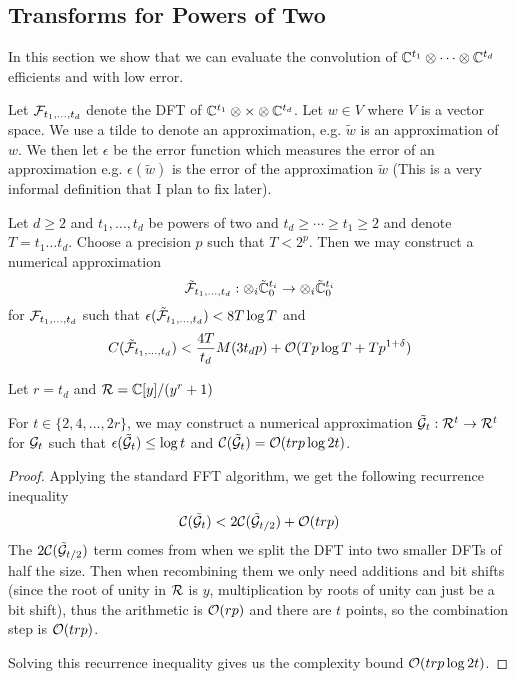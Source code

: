 \subsection{Transforms for Powers of Two}

In this section we show that we can evaluate the convolution of ${\mathbb C}^{t_1} \otimes \cdots \otimes {\mathbb C}^{t_d}$ efficients and with low error.

Let $\mathcal F_{t_1, \ldots, t_d}$ denote the DFT of ${\mathbb C}^{t_1} \otimes \times \otimes {\mathbb C}^{t_d}$.
Let $w \in V$ where $V$ is a vector space. We use a tilde to denote an approximation, e.g. $\tilde{w}$ is an approximation of $w$. We then let $\epsilon$ be the error function which measures the error of an approximation e.g. $\epsilon(\tilde{w})$ is the error of the approximation $\tilde{w}$ (This is a very informal definition that I plan to fix later).

\begin{theorem}
    Let $d \geq 2$ and $t_1, \ldots, t_d$ be powers of two and $t_d \geq \cdots \geq t_1 \geq 2$ and denote $T = t_1 \ldots t_d$. Choose a precision $p$ such that $T < 2^p$. Then we may construct a numerical approximation
    \[
        \tilde {\mathcal F}_{t_1, \ldots, t_d} : \otimes_i \tilde{{\mathbb C}}^{t_i}_0 \to \otimes_i \tilde{{\mathbb C}}^{t_i}_0
    \]
    for $\mathcal F_{t_1, \ldots, t_d}$ such that $\epsilon(\tilde{\mathcal F}_{t_1, \ldots, t_d}) < 8 T \log T$ and
    \[
        C(\tilde{\mathcal F}_{t_1, \ldots, t_d}) < \frac{4T}{t_d} M(3t_d p) + \mathcal O(Tp\log T + Tp^{1 + \delta})
    \]
\end{theorem}

Let $r = t_d$ and $\mathcal R = {\mathbb C}[y] / (y^r + 1)$

\begin{lemma}
    For $t \in \{2, 4, \ldots, 2r\}$, we may construct a numerical approximation $\tilde{\mathcal G}_t: \mathcal R^t \to \mathcal R^t$ for $\mathcal G_t$ such that $\epsilon (\tilde{\mathcal G}_t) \leq \log t$ and $\mathcal C(\tilde{\mathcal G}_t)= \mathcal O(trp \log 2t)$.
\end{lemma}

\begin{proof}
    Applying the standard FFT algorithm, we get the following recurrence inequality
    \[
        \mathcal C(\tilde{\mathcal G}_t) < 2 \mathcal C(\tilde{\mathcal G}_{t/2}) + \mathcal O(trp)
    \]
    The $2 \mathcal C(\tilde{\mathcal G}_{t/2})$ term comes from when we split the DFT into two smaller DFTs of half the size. Then when recombining them we only need additions and bit shifts (since the root of unity in $\mathcal R$ is $y$, multiplication by roots of unity can just be a bit shift), thus the arithmetic is $\mathcal O(rp)$ and there are $t$ points, so the combination step is $\mathcal O(trp)$.

    Solving this recurrence inequality gives us the complexity bound $\mathcal O(trp \log 2t)$.
\end{proof}

